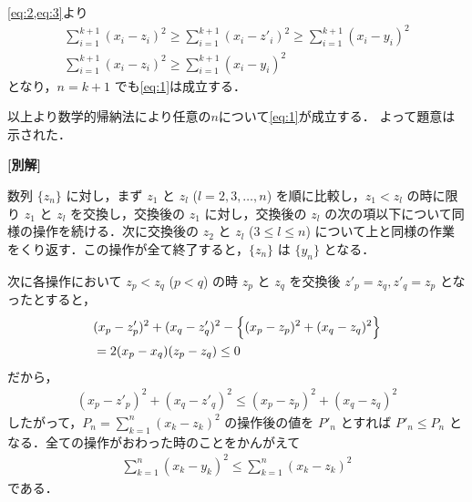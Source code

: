 \documentclass[../../main.tex]{subfiles}
\begin{document}
\cref{eq:2,eq:3}より
\begin{align}
  \sum_{i=1}^{k+1} (x_i - z_i)^2 \ge \sum_{i=1}^{k+1}(x_i - z'_i)^2 \ge \sum_{i=1}^{k+1} (x_i - y_i)^2 \\
  \sum_{i=1}^{k+1} (x_i - z_i)^2 \ge \sum_{i=1}^{k+1} (x_i - y_i)^2
\end{align}
となり，$n = k+1$ でも\cref{eq:1}は成立する．
\casesend

以上より数学的帰納法により任意の$n$について\cref{eq:1}が成立する．
よって題意は示された．

{\bf [別解]}

数列 $\{z_n\}$ に対し，まず $z_1$ と $z_l$ ($l = 2, 3, \dots, n$) を順に比較し，$z_1 < z_l$ の時に限り $z_1$ と $z_l$ を交換し，交換後の $z_1$ に対し，交換後の $z_l$ の次の項以下について同様の操作を続ける．次に交換後の $z_2$ と $z_l$ ($3 \le l \le n$) について上と同様の作業をくり返す．この操作が全て終了すると，$\{z_n\}$ は $\{y_n\}$ となる．

次に各操作において $z_p < z_q$ ($p < q$) の時 $z_p$ と $z_q$ を交換後 $z'_p = z_q, z'_q = z_p$ となったとすると，
\begin{align}
  &(x_p - z'_p)^2 + (x_q - z'_q)^2 - \Bigl\{ (x_p - z_p)^2 + (x_q - z_q)^2 \Bigr\} \\
  &= 2(x_p - x_q)(z_p - z_q) \le 0
\end{align}
だから，
\begin{align}
  (x_p - z'_p)^2 + (x_q - z'_q)^2 \le (x_p - z_p)^2 + (x_q - z_q)^2
\end{align}
したがって，$P_n = \sum_{k=1}^n (x_k - z_k)^2$ の操作後の値を $P'_n$ とすれば $P'_n \le P_n$ となる．全ての操作がおわった時のことをかんがえて
\begin{align}
  \sum_{k=1}^n (x_k - y_k)^2 \le \sum_{k=1}^n (x_k - z_k)^2
\end{align}
である．
\end{document}
